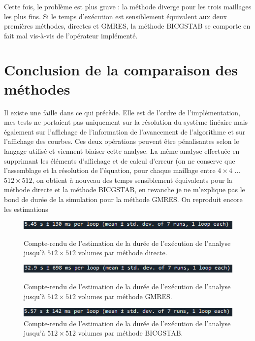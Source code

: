 \newpage

Cette fois, le problème est plus grave : la méthode diverge pour les trois maillages les plus fins. Si le temps d'exécution est sensiblement équivalent aux deux premières méthodes, directes et GMRES, la méthode BICGSTAB se comporte en fait mal vis-à-vis de l'opérateur implémenté.

\section{Conclusion de la comparaison des méthodes}

Il existe une faille dans ce qui précède. Elle est de l'ordre de l'implémentation, mes tests ne portaient pas uniquement sur la résolution du système linéaire mais également sur l'affichage de l'information de l'avancement de l'algorithme et sur l'affichage des courbes. Ces deux opérations peuvent être pénalisantes selon le langage utilisé et viennent biaiser cette analyse. La même analyse effectuée en supprimant les éléments d'affichage et de calcul d'erreur (on ne conserve que l'assemblage et la résolution de l'équation, pour chaque maillage entre $4 \times 4$ ... $512 \times 512$, on obtient à nouveau des temps sensiblement équivalents pour la méthode directe et la méthode BICGSTAB, en revanche je ne m'explique pas le bond de durée de la simulation pour la méthode GMRES. On reproduit encore les estimations
\begin{figure}[htp]
\centering
    \includegraphics[width=12cm]{Images/preliminaires/Laplace Dirichlet 2D creux/temps3.png}
    \caption{Compte-rendu de l'estimation de la durée de l'exécution de l'analyse jusqu'à $512 \times 512$ volumes par méthode directe.}
    
    \includegraphics[width=12cm]{Images/preliminaires/Laplace Dirichlet 2D creux GMRES/temps2.png}
    \caption{Compte-rendu de l'estimation de la durée de l'exécution de l'analyse jusqu'à $512 \times 512$ volumes par méthode GMRES.}
    
    \includegraphics[width=12cm]{Images/preliminaires/Laplace Dirichlet 2D creux BICGSTAB/temps2.png}
    \caption{Compte-rendu de l'estimation de la durée de l'exécution de l'analyse jusqu'à $512 \times 512$ volumes par méthode BICGSTAB.}
    \label{fig:creuxLaplacienDirichlet2DConclusion}
\end{figure}

